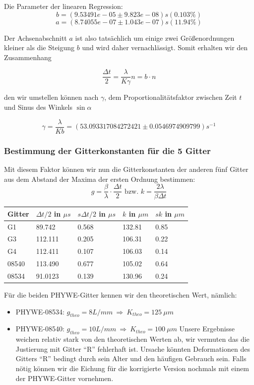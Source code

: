 Die Parameter der linearen Regression:
$$ b               = (9.53491e-05      \pm 9.823e-08) s    (0.103\%) $$
$$ a               = (8.74055e-07      \pm 1.043e-07) s    (11.94\%) $$

Der Achsenabschnitt $a$ ist also tatsächlich um einige zwei Größenordnungen kleiner als die Steigung $b$ und wird daher vernachlässigt. Somit erhalten wir den Zusammenhang

$$\frac{\Delta t}{2} = \frac{\lambda}{K\gamma}n = b\cdot n$$

den wir umstellen können nach $\gamma$, dem Proportionalitätsfaktor zwischen Zeit $t$ und Sinus des Winkels $\sin \alpha$ 

$$ \gamma = \frac{\lambda}{Kb} = (53.093317084272421 \pm 0.0546974909799) s^{-1} $$


\subsubsection{Bestimmung der Gitterkonstanten f\"ur die 5 Gitter}

Mit diesem Faktor können wir nun die Gitterkonstanten der anderen fünf Gitter aus dem Abstand der Maxima der ersten Ordnung bestimmen:
$$ g = \frac{\beta}{\lambda}\cdot \frac{\Delta t}{2} \text{ bzw. } k = \frac{2 \lambda }{\beta \Delta t} $$
\begin{center}
\begin{tabular}{lllll}
\toprule 
Gitter & $\Delta t /2$ in $\mu s$ & $s\Delta t /2$ in $\mu s$ & $k$ in $\mu m$ & $sk$ in $\mu m$\\
\midrule
G1 & 89.742 & 0.568 & 132.81 & 0.85\\
G3 & 112.111 & 0.205 & 106.31 & 0.22\\
G4 & 112.411 & 0.107 & 106.03 & 0.14\\
08540 & 113.490 & 0.677 & 105.02 & 0.64\\
08534 & 91.0123 & 0.139 & 130.96 & 0.24\\
\bottomrule
\end{tabular} 
\end{center}

F\"ur die beiden PHYWE-Gitter kennen wir den theoretischen Wert, n\"amlich: 
\begin{itemize}
\item PHYWE-08534: $g_{theo} = 8 L/mm\ \Rightarrow \ K_{theo} = 125 \ \mu m$
\item PHYWE-08540: $g_{theo} = 10 L/mm\ \Rightarrow \ K_{theo} = 100 \ \mu m$
Unsere Ergebnisse weichen relativ stark von den theoretischen Werten ab, wir vermuten das die Justierung mit Gitter ``R'' fehlerhaft ist. Ursache könnten Deformationen des Gitters ``R'' bedingt durch sein Alter und den häufigen Gebrauch sein. Falls nötig können wir die Eichung für die korrigierte Version nochmals mit einem der PHYWE-Gitter vornehmen.
\end{itemize} 

